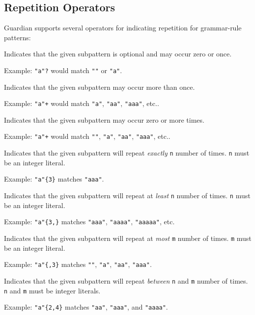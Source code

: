 
\subsection{Repetition Operators}
{
	Guardian supports several operators for indicating
	repetition for grammar-rule patterns:
	
	\begin{itemize}
	{
		\item[\texttt{(...)?}] Indicates that the given subpattern is optional
			and may occur zero or once.
			
			Example: \texttt{"a"?} would match \texttt{""} or \texttt{"a"}.
		\item[\texttt{(...)+}] Indicates that the given subpattern may occur
			more than once.
			
			Example: \texttt{"a"+} would match \texttt{"a"},
				\texttt{"aa"}, \texttt{"aaa"}, etc..
		\item[\texttt{(...)*}] Indicates that the given subpattern may occur
			zero or more times.
			
			Example: \texttt{"a"+} would match \texttt{""}, \texttt{"a"},
				\texttt{"aa"}, \texttt{"aaa"}, etc..
		\item[\texttt{(...)\{n\}}] Indicates that the given subpattern will
			repeat \textit{exactly} \texttt{n} number of times.
			\texttt{n} must be an integer
			literal.
			
			Example: \texttt{"a"\{3\}} matches \texttt{"aaa"}.
		\item[\texttt{(...)\{n,\}}] Indicates that the given subpattern will
			repeat at \textit{least} \texttt{n} number of
			times. \texttt{n} must be an integer
			literal.
			
			Example: \texttt{"a"\{3,\}} matches \texttt{"aaa"}, \texttt{"aaaa"},
			\texttt{"aaaaa"}, etc.
		\item[\texttt{(...)\{,m\}}] Indicates that the given subpattern will
			repeat at \textit{most} \texttt{m} number of
			times. \texttt{m} must be an integer literal.
			
			Example: \texttt{"a"\{,3\}} matches \texttt{""}, \texttt{"a"},
			\texttt{"aa"}, \texttt{"aaa"}.
		\item[\texttt{(...)\{n,m\}}] Indicates that the given subpattern will
			repeat \textit{between} \texttt{n} and \texttt{m} number of
			times. \texttt{n} and \texttt{m} must be integer literals.
			
			Example: \texttt{"a"\{2,4\}} matches \texttt{"aa"}, \texttt{"aaa"},
			and \texttt{"aaaa"}.
	}
	\end{itemize}
}



















